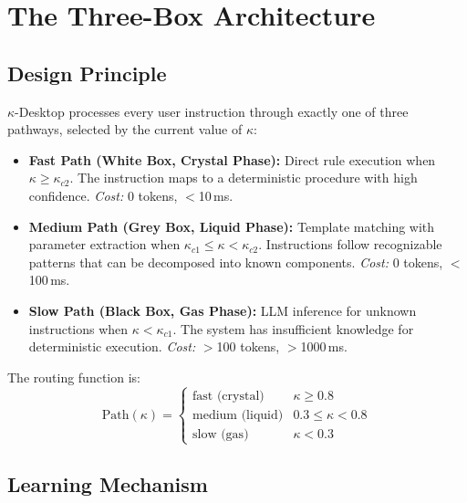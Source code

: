 \documentclass[10pt,twocolumn]{article}
\newcommand{\kap}{\kappa}
\newcommand{\kdes}{$\kappa$-Desktop}
\begin{document}
\section{The Three-Box Architecture}

\subsection{Design Principle}

\kdes{} processes every user instruction through exactly 
one of three pathways, selected by the current value of 
$\kap$:

\begin{itemize}[leftmargin=*, itemsep=2pt]
  \item \textbf{Fast Path (White Box, Crystal Phase):} 
    Direct rule execution when $\kap \geq \kap_{c2}$. 
    The instruction maps to a deterministic procedure with 
    high confidence. \textit{Cost:} 0 tokens, $<$10\,ms.
    
  \item \textbf{Medium Path (Grey Box, Liquid Phase):} 
    Template matching with parameter extraction when 
    $\kap_{c1} \leq \kap < \kap_{c2}$. Instructions 
    follow recognizable patterns that can be decomposed 
    into known components. \textit{Cost:} 0 tokens, 
    $<$100\,ms.
    
  \item \textbf{Slow Path (Black Box, Gas Phase):} 
    LLM inference for unknown instructions when 
    $\kap < \kap_{c1}$. The system has insufficient 
    knowledge for deterministic execution. \textit{Cost:} 
    $>$100 tokens, $>$1000\,ms.
\end{itemize}

The routing function is:
\begin{equation}
  \text{Path}(\kap) = 
  \begin{cases}
    \text{fast (crystal)} & \kap \geq 0.8 \\
    \text{medium (liquid)} & 0.3 \leq \kap < 0.8 \\
    \text{slow (gas)} & \kap < 0.3
  \end{cases}
  \label{eq:routing}
\end{equation}

\subsection{Learning Mechanism}
\end{document}
